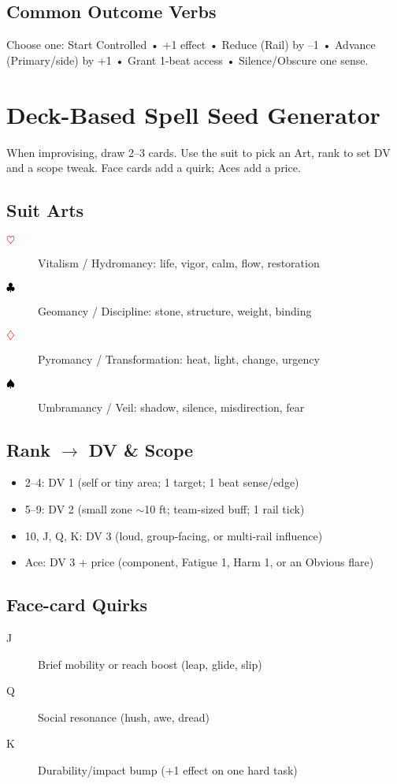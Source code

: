 \subsection{Common Outcome Verbs}
Choose one: Start Controlled • +1 effect • Reduce (Rail) by --1 • Advance (Primary/side) by +1 • Grant 1-beat access • Silence/Obscure one sense.

\section{Deck-Based Spell Seed Generator}

When improvising, draw 2--3 cards. Use the suit to pick an Art, rank to set DV and a scope tweak. Face cards add a quirk; Aces add a price.

\subsection{Suit Arts}
\begin{description}
\item[\textcolor{red}{$\heartsuit$}] Vitalism / Hydromancy: life, vigor, calm, flow, restoration
\item[\textcolor{black}{$\clubsuit$}] Geomancy / Discipline: stone, structure, weight, binding
\item[\textcolor{red}{$\diamondsuit$}] Pyromancy / Transformation: heat, light, change, urgency
\item[\textcolor{black}{$\spadesuit$}] Umbramancy / Veil: shadow, silence, misdirection, fear
\end{description}

\subsection{Rank $\rightarrow$ DV \& Scope}
\begin{itemize}
\item 2--4: DV 1 (self or tiny area; 1 target; 1 beat sense/edge)
\item 5--9: DV 2 (small zone $\sim$10 ft; team-sized buff; 1 rail tick)
\item 10, J, Q, K: DV 3 (loud, group-facing, or multi-rail influence)
\item Ace: DV 3 + price (component, Fatigue 1, Harm 1, or an Obvious flare)
\end{itemize}

\subsection{Face-card Quirks}
\begin{description}
\item[J] Brief mobility or reach boost (leap, glide, slip)
\item[Q] Social resonance (hush, awe, dread)
\item[K] Durability/impact bump (+1 effect on one hard task)
\end{description}

